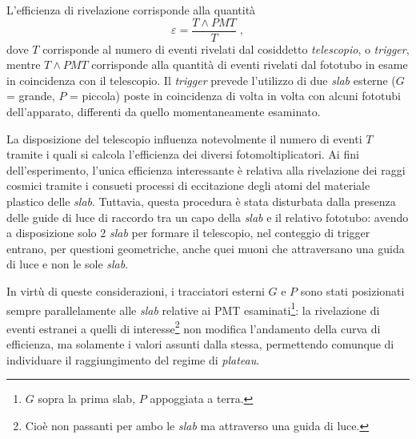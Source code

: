\documentclass[10pt, oneside, a4paper]{article}   	%
\begin{document}
L'efficienza di rivelazione corrisponde alla quantità
\[\varepsilon = \frac{T\wedge PMT}{T}\;,\]
dove $T$ corrisponde al numero di eventi rivelati dal cosiddetto \textit{telescopio}, o \textit{trigger}, mentre $T\wedge PMT$ corrisponde alla quantità di eventi rivelati dal fototubo in esame in coincidenza con il telescopio. Il \emph{trigger} prevede l'utilizzo di due \emph{slab} esterne \linebreak ($G$ = grande, $P$ = piccola) poste in coincidenza di volta in volta con alcuni fototubi dell'apparato, differenti da quello momentaneamente esaminato. 

La disposizione del telescopio influenza notevolmente il numero di eventi $T$ tramite i quali si calcola l'efficienza dei diversi fotomoltiplicatori. Ai fini dell'esperimento, l'unica efficienza interessante è relativa alla rivelazione dei raggi cosmici tramite i consueti processi di eccitazione degli atomi del materiale plastico delle \emph{slab}. 
Tuttavia, questa procedura è stata disturbata dalla presenza delle guide di luce di raccordo tra un capo della \emph{slab} e il relativo fototubo: 
avendo a disposizione solo 2 \emph{slab} per formare il telescopio, nel conteggio di trigger entrano, per questioni geometriche, anche quei muoni che attraversano una guida di luce e non le sole \emph{slab}.

In virtù di queste considerazioni, i tracciatori esterni $G$ e $P$ sono stati posizionati sempre parallelamente alle \emph{slab} relative ai PMT esaminati\footnote{$G$ sopra la prima slab, $P$ appoggiata a terra.}: la rivelazione di eventi estranei  
a quelli di interesse\footnote{Cioè non passanti per ambo le \emph{slab} ma attraverso una guida di luce.} 
non modifica l'andamento della curva di efficienza, ma solamente i valori assunti dalla stessa, permettendo comunque di individuare il raggiungimento del regime di \emph{plateau}.
\end{document}

